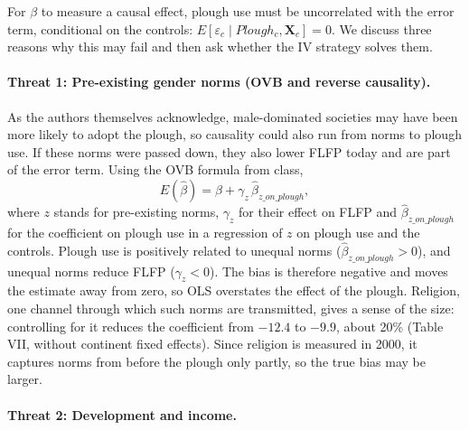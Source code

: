 \documentclass[11pt,a4paper]{article}
\begin{document}
For $\beta$ to measure a causal effect, plough use must be uncorrelated with the error term, conditional on the controls: $E[\varepsilon_c \mid Plough_c, \mathbf{X}_c] = 0$. We discuss three reasons why this may fail and then ask whether the IV strategy solves them.

\paragraph{Threat 1: Pre-existing gender norms (OVB and reverse causality).}

As the authors themselves acknowledge, male-dominated societies may have been more likely to adopt the plough, so causality could also run from norms to plough use. If these norms were passed down, they also lower FLFP today and are part of the error term. Using the OVB formula from class,
\[
E(\hat\beta) = \beta + \gamma_z \, \hat\beta_{z\_on\_plough} ,
\]
where $z$ stands for pre-existing norms, $\gamma_z$ for their effect on FLFP and $\hat\beta_{z\_on\_plough}$ for the coefficient on plough use in a regression of $z$ on plough use and the controls. Plough use is positively related to unequal norms ($\hat\beta_{z\_on\_plough} > 0$), and unequal norms reduce FLFP ($\gamma_z < 0$). The bias is therefore negative and moves the estimate away from zero, so OLS overstates the effect of the plough. Religion, one channel through which such norms are transmitted, gives a sense of the size: controlling for it reduces the coefficient from $-12.4$ to $-9.9$, about 20\% (Table VII, without continent fixed effects). Since religion is measured in 2000, it captures norms from before the plough only partly, so the true bias may be larger.

\paragraph{Threat 2: Development and income.}
\end{document}
